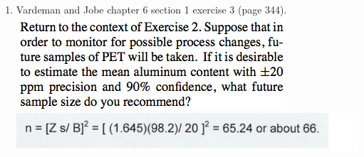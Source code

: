 \documentclass{article}\usepackage{graphicx, color}
\numberwithin{equation}{section}
\begin{document}
\begin{flushleft}
\begin{enumerate}[1. ]
\item Vardeman and Jobe chapter 6 section 1 exercise 3 (page 344).
 \includegraphics{../../fig/h8p3.png}
 \includegraphics{../../fig/h8p3sol.png}




\end{enumerate}
\end{flushleft}
\end{document}
